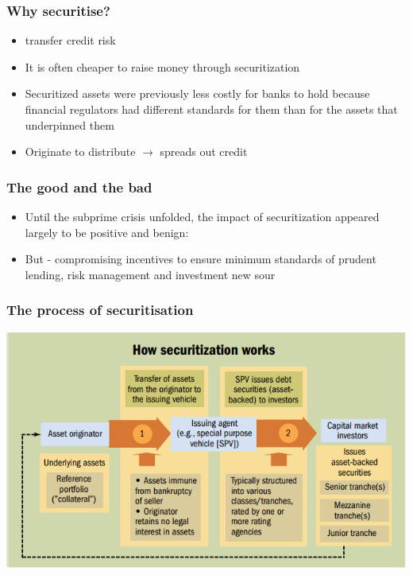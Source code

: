 \documentclass[11pt]{beamer}
\begin{document}
\begin{frame}
\frametitle{Why securitise?}
\begin{itemize}
\item transfer credit risk
\item It is often cheaper to raise money through securitization
\item Securitized assets were previously less costly for banks to hold because financial regulators had different standards for them than for the assets that underpinned them
\item Originate to distribute $\rightarrow$ spreads out credit
\end{itemize}
\end{frame}

\begin{frame}
\frametitle{The good and the bad}
\begin{itemize}
\item Until the subprime crisis unfolded, the impact of securitization appeared largely to be positive and benign:
\item But - compromising incentives to ensure minimum standards of prudent lending, risk management and investment new sour
\end{itemize}
\end{frame}



\begin{frame}
\frametitle{The process of securitisation}
\includegraphics[width=\textwidth]{Sec1.png}
\end{frame}
\end{document}
